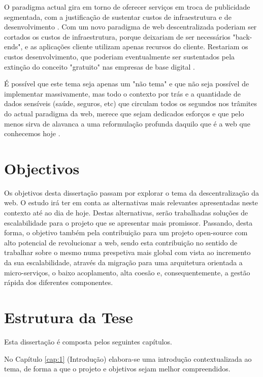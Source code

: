 O paradigma actual gira em torno de oferecer serviços em troca de publicidade segmentada, com a justificação de sustentar custos de infraestrutura e de desenvolvimento \cite{top_three_issues_centralized_web}. Com um novo paradigma de web descentralizada poderiam ser cortados os custos de infraestrutura, porque deixariam de ser necessários "back-ends", e as aplicações cliente utilizam apenas recursos do cliente. Restariam os custos desenvolvimento, que poderiam eventualmente ser sustentados pela extinção do conceito "gratuito" nas empresas de base digital \cite{why_web_decentralization_future}.

É possível que este tema seja apenas um "não tema" e que não seja possível de implementar massivamente, mas todo o contexto por trás e a quantidade de dados sensíveis (saúde, seguros, etc) que circulam todos os segundos nos trâmites do actual paradigma da web,
merece que sejam dedicados esforços e que pelo menos sirva de alavanca a uma reformulação profunda daquilo que é a web que conhecemos hoje \cite{why_web_decentralization_future}.

\section{Objectivos}
Os objetivos desta dissertação passam por explorar o tema da descentralização da web. O estudo irá ter em conta as alternativas mais relevantes apresentadas neste contexto até ao dia de hoje. Destas alternativas, serão trabalhadas soluções de escalabilidade para o projeto que se apresentar mais promissor.
Passando, desta forma, o objetivo também pela contribuição para um projeto open-source com alto potencial de revolucionar a web, sendo esta contribuição no sentido de trabalhar sobre o mesmo numa prespetiva mais global com vista ao incremento da sua escalabilidade, através da migração para uma arquitetura orientada a micro-serviços, o baixo acoplamento, alta coesão e, consequentemente, a gestão rápida dos diferentes componentes.

\section{Estrutura da Tese}

Esta dissertação é composta pelos seguintes capítulos.

No Capítulo \ref{cap:1} (Introdução) elabora-se uma introdução contextualizada ao tema, de forma a que o projeto e objetivos sejam melhor compreendidos.

